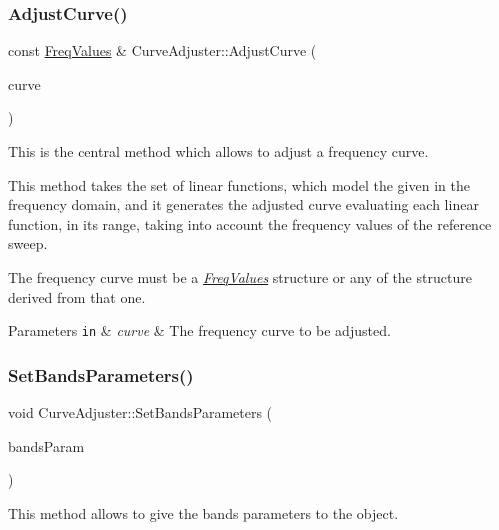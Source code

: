 \subsubsection{\texorpdfstring{Adjust\+Curve()}{AdjustCurve()}}
{\footnotesize\ttfamily const \hyperlink{structFreqValues}{Freq\+Values} \& Curve\+Adjuster\+::\+Adjust\+Curve (\begin{DoxyParamCaption}\item[{const \hyperlink{structFreqValues}{Freq\+Values} \&}]{curve }\end{DoxyParamCaption})}



This is the central method which allows to adjust a frequency curve. 

This method takes the set of linear functions, which model the given in the frequency domain, and it generates the adjusted curve evaluating each linear function, in its range, taking into account the frequency values of the reference sweep.

The frequency curve must be a {\itshape \hyperlink{structFreqValues}{Freq\+Values}} structure or any of the structure derived from that one. 
\begin{DoxyParams}[1]{Parameters}
\mbox{\tt in}  & {\em curve} & The frequency curve to be adjusted. \\
\hline
\end{DoxyParams}
\mbox{\label{classCurveAdjuster_a17080bae5109c5128caa4c214b856e19}} 
\subsubsection{\texorpdfstring{Set\+Bands\+Parameters()}{SetBandsParameters()}}
{\footnotesize\ttfamily void Curve\+Adjuster\+::\+Set\+Bands\+Parameters (\begin{DoxyParamCaption}\item[{const std\+::vector$<$ \hyperlink{structBandParameters}{Band\+Parameters} $>$ \&}]{bands\+Param }\end{DoxyParamCaption})\hspace{0.3cm}{\ttfamily [inline]}}



This method allows to give the bands\textquotesingle{} parameters to the object. 

